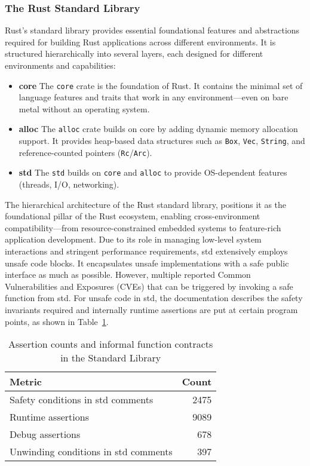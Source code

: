 \documentclass[conference]{IEEEtran}
\begin{document}
\subsubsection{The Rust Standard Library}
Rust's standard library provides essential foundational features and abstractions required for building Rust applications across different environments. It is structured hierarchically into several layers, each designed for different environments and capabilities:
\begin{itemize}
        \item \textbf{core} The \texttt{core} crate is the foundation of Rust. It contains the minimal set of language features and traits that work in any environment—even on bare metal without an operating system.
        \item \textbf{alloc} The \texttt{alloc} crate builds on core by adding dynamic memory allocation support. It provides heap-based data structures such as \texttt{Box}, \texttt{Vec}, \texttt{String}, and reference-counted pointers (\texttt{Rc}/\texttt{Arc}).
        \item \textbf{std} The \texttt{std} builds on \texttt{core} and \texttt{alloc} to provide OS-dependent features (threads, I/O, networking).
\end{itemize}

The hierarchical architecture of the Rust standard library, positions it as the foundational pillar of the Rust ecosystem, enabling cross-environment compatibility—from resource-constrained embedded systems to feature-rich application development. Due to its role in managing low-level system interactions and stringent performance requirements, std extensively employs unsafe code blocks. It encapsulates unsafe implementations with a safe public interface as much as possible. However, multiple reported Common Vulnerabilities and Exposures (CVEs)\cite{Qwaz_rust-cve} that can be triggered by invoking a safe function from std. For unsafe code in std, the documentation describes the safety invariants required and internally runtime assertions are put at certain program points, as shown in Table~\ref{tab:assertion_counts}.   

\begin{table}[htbp]
\centering
\begin{tabular}{l r}
\toprule
\textbf{Metric} & \textbf{Count} \\
\midrule
Safety conditions in std comments & 2475 \\
Runtime assertions & 9089 \\
Debug assertions & 678 \\
Unwinding conditions in std comments & 397 \\
\bottomrule
\end{tabular}
\caption{Assertion counts and informal function contracts in the Standard Library}
\label{tab:assertion_counts}
\end{table}
\end{document}
